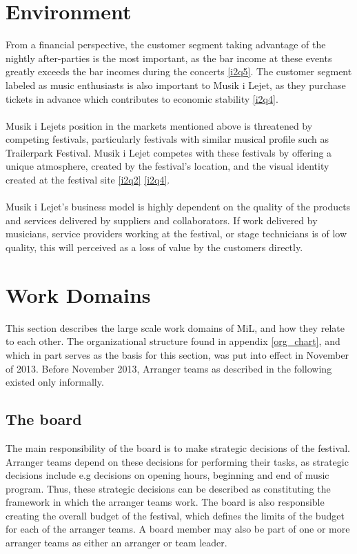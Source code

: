 \section{Environment}
From a financial perspective, the customer segment taking advantage of the nightly after-parties is the most important, as the bar income at these events greatly exceeds the bar incomes during the concerts \ref{i2q5}. The customer segment labeled as music enthusiasts is also important to Musik i Lejet, as they purchase tickets in advance which contributes to economic stability \ref{i2q4}.
\\ \\
Musik i Lejets position in the markets mentioned above is threatened by competing festivals, particularly festivals with similar musical profile such as Trailerpark Festival. Musik i Lejet competes with these festivals by offering a unique atmosphere, created by the festival's location, and the visual identity created at the festival site \ref{i2q2} \ref{i2q4}.
\\ \\
Musik i Lejet's business model is highly dependent on the quality of the products and services delivered by suppliers and collaborators. If work delivered by musicians, service providers working at the festival, or stage technicians is of low quality, this will perceived as a loss of value by the customers directly.

\section{Work Domains}
\label{sec:work_domains}
This section describes the large scale work domains of MiL, and how they relate to each other. The organizational structure found in appendix \ref{org_chart}, and which in part serves as the basis for this section, was put into effect in November of 2013. Before November 2013, Arranger teams as described in the following existed only informally.
\subsection{The board}
\label{sub:the_board}
The main responsibility of the board is to make strategic decisions of the festival. Arranger teams depend on these decisions for performing their tasks, as strategic decisions include e.g decisions on opening hours, beginning and end of music program. Thus, these strategic decisions can be described as constituting the framework in which the arranger teams work. The board is also responsible creating the overall budget of the festival, which defines the limits of the budget for each of the arranger teams. A board member may also be part of one or more arranger teams as either an arranger or team leader.

